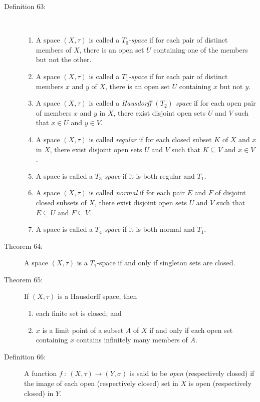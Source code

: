 \documentclass{article}
\begin{document}
\begin{description}
  \item[Definition 63:] $\ $
    \begin{enumerate}[\hspace{1cm}1.]
      \item A space $(X,\tau)$ is called a \emph{$T_{0}$-space} if for each pair of distinct members of $X$, there is an open set $U$ containing one of the members but not the other.
      \item A space $(X,\tau)$ is called a \emph{$T_{1}$-space} if for each pair of distinct members $x$ and $y$ of $X$, there is an open set $U$ containing $x$ but not $y$.
      \item A space $(X,\tau)$ is called a \emph{Hausdorff $(T_{2})$ space} if for each open pair of members $x$ and $y$ in $X$, there exist disjoint open sets $U$ and $V$ such that $x \in U$ and $y \in V$.
      \item A space $(X,\tau)$ is called \emph{regular} if for each closed subset $K$ of $X$ and $x$ in $X$, there exist disjoint open sets $U$ and $V$ such that $K \subseteq V$ and $x \in V$.
      \item A space is called a \emph{$T_{3}$-space} if it is both regular and $T_{1}$.
      \item A space $(X,\tau)$ is called \emph{normal} if for each pair $E$ and $F$ of disjoint closed subsets of $X$, there exist disjoint open sets $U$ and $V$ such that $E \subseteq U$ and $F \subseteq V$.
      \item A space is called a \emph{$T_{4}$-space} if it is both normal and $T_{1}$.
    \end{enumerate}

  \item[Theorem 64:] A space $(X,\tau)$ is a $T_{1}$-space if and only if singleton sets are closed.

  \item[Theorem 65:] If $(X,\tau)$ is a Hausdorff space, then
    \begin{enumerate}[\hspace{1cm}1.]
      \item each finite set is closed; and
      \item $x$ is a limit point of a subset $A$ of $X$ if and only if each open set containing $x$ contains infinitely many members of $A$.
    \end{enumerate}

  \item[Definition 66:] A function $f \ : \ (X,\tau) \rightarrow (Y,\sigma)$ is said to be \emph{open} (respectively closed) if the image of each open (respectively closed) set in $X$ is open (respectively closed) in $Y$.


\end{description}
\end{document}
